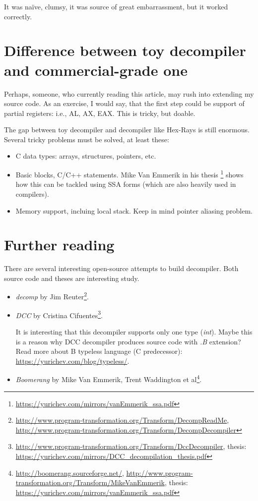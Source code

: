 ﻿\documentclass[12pt]{article}
\begin{document}
It was naïve, clumsy, it was source of great embarrassment, but it worked correctly.

\section{Difference between toy decompiler and commercial-grade one}

Perhaps, someone, who currently reading this article, may rush into extending my source code.
As an exercise, I would say, that the first step could be support of partial registers: i.e., AL, AX, EAX.
This is tricky, but doable.

The gap between toy decompiler and decompiler like Hex-Rays is still enormous.
Several tricky problems must be solved, at least these:

\begin{itemize}
\item C data types: arrays, structures, pointers, etc.

\item Basic blocks, C/C++ statements. Mike Van Emmerik in his thesis
\footnote{\url{https://yurichev.com/mirrors/vanEmmerik_ssa.pdf}} shows how this can be tackled using \ac{SSA} forms
(which are also heavily used in compilers).

\item Memory support, incluing local stack. Keep in mind pointer aliasing problem.
\end{itemize}

\section{Further reading}

There are several interesting open-source attempts to build decompiler.
Both source code and theses are interesting study.

\begin{itemize}
	\item \textit{decomp} by Jim Reuter\footnote{
			\url{http://www.program-transformation.org/Transform/DecompReadMe},
			\url{http://www.program-transformation.org/Transform/DecompDecompiler}}.

	\item \textit{DCC} by Cristina Cifuentes\footnote{
			\url{http://www.program-transformation.org/Transform/DccDecompiler},
			thesis: \url{https://yurichev.com/mirrors/DCC_decompilation_thesis.pdf}}.

		It is interesting that this decompiler supports only one type (\textit{int}).
		Maybe this is a reason why DCC decompiler produces source code with \textit{.B} extension?
		Read more about B typeless language (C predecessor): \url{https://yurichev.com/blog/typeless/}.

	\item \textit{Boomerang} by Mike Van Emmerik, Trent Waddington et al\footnote{
			\url{http://boomerang.sourceforge.net/},
			\url{http://www.program-transformation.org/Transform/MikeVanEmmerik},
			thesis: \url{https://yurichev.com/mirrors/vanEmmerik_ssa.pdf}}.
\end{itemize}
\end{document}
